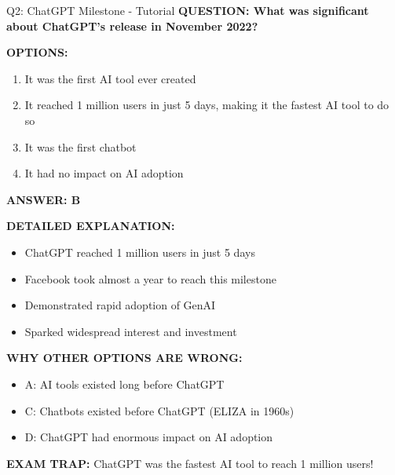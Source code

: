 \documentclass[8pt]{beamer}
\begin{document}
	\begin{frame}{Q2: ChatGPT Milestone - Tutorial}
		\fontsize{6.5}{7.5}\selectfont
		\textbf{QUESTION: What was significant about ChatGPT's release in November 2022?}
		
		\vspace{0.1cm}
		\textbf{OPTIONS:}
		\begin{enumerate}
			\item It was the first AI tool ever created
			\item It reached 1 million users in just 5 days, making it the fastest AI tool to do so
			\item It was the first chatbot
			\item It had no impact on AI adoption
		\end{enumerate}
		
		\vspace{0.1cm}
		\textcolor{myblue}{\textbf{ANSWER: B}}
		
		\vspace{0.1cm}
		\textbf{DETAILED EXPLANATION:}
		\begin{itemize}
			\item ChatGPT reached 1 million users in just 5 days
			\item Facebook took almost a year to reach this milestone
			\item Demonstrated rapid adoption of GenAI
			\item Sparked widespread interest and investment
		\end{itemize}
		
		\vspace{0.1cm}
		\textcolor{myred}{\textbf{WHY OTHER OPTIONS ARE WRONG:}}
		\begin{itemize}
			\item \textcolor{myred}{A:} AI tools existed long before ChatGPT
			\item \textcolor{myred}{C:} Chatbots existed before ChatGPT (ELIZA in 1960s)
			\item \textcolor{myred}{D:} ChatGPT had enormous impact on AI adoption
		\end{itemize}
		
		\textcolor{myred}{\textbf{EXAM TRAP:}} ChatGPT was the \textcolor{myblue}{fastest AI tool} to reach 1 million users!
	\end{frame}
	
\end{document}
